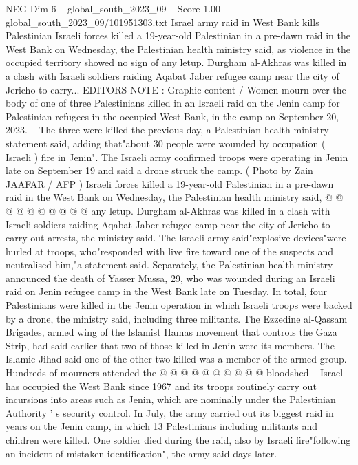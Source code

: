 \begin{textsample}{NEG Dim 6 – global\_south\_2023\_09 – Score 1.00 – global\_south\_2023\_09/101951303.txt}  \label{ex:f6_neg_003}
Israel army raid in West Bank kills Palestinian Israeli forces killed a 19-year-old Palestinian in a pre-dawn raid in the West Bank on Wednesday, the Palestinian health ministry said, as violence in the occupied territory showed no sign of any letup.
Durgham al-Akhras was killed in a clash with Israeli soldiers raiding Aqabat Jaber refugee camp near the city of Jericho to carry...
EDITORS NOTE : Graphic content / Women mourn over the body of one of three Palestinians killed in an Israeli raid on the Jenin camp for Palestinian refugees in the occupied West Bank, in the camp on September 20, 2023. -- The three were killed the previous day, a Palestinian health ministry statement said, adding that"about 30 people were wounded by occupation ( Israeli ) fire in Jenin".
The Israeli army confirmed troops were operating in Jenin late on September 19 and said a drone struck the camp. ( Photo by Zain JAAFAR / AFP ) Israeli forces killed a 19-year-old Palestinian in a pre-dawn raid in the West Bank on Wednesday, the Palestinian health ministry said, @ @ @ @ @ @ @ @ @ @ any letup.
Durgham al-Akhras was killed in a clash with Israeli soldiers raiding Aqabat Jaber refugee camp near the city of Jericho to carry out arrests, the ministry said.
The Israeli army said"explosive devices"were hurled at troops, who"responded with live fire toward one of the suspects and neutralised him,"a statement said.
Separately, the Palestinian health ministry announced the death of Yasser Mussa, 29, who was wounded during an Israeli raid on Jenin refugee camp in the West Bank late on Tuesday.
In total, four Palestinians were killed in the Jenin operation in which Israeli troops were backed by a drone, the ministry said, including three militants.
The Ezzedine al-Qassam Brigades, armed wing of the Islamist Hamas movement that controls the Gaza Strip, had said earlier that two of those killed in Jenin were its members.
The Islamic Jihad said one of the other two killed was a member of the armed group.
Hundreds of mourners attended the @ @ @ @ @ @ @ @ @ @ bloodshed -- Israel has occupied the West Bank since 1967 and its troops routinely carry out incursions into areas such as Jenin, which are nominally under the Palestinian Authority ' s security control.
In July, the army carried out its biggest raid in years on the Jenin camp, in which 13 Palestinians including militants and children were killed.
One soldier died during the raid, also by Israeli fire"following an incident of mistaken identification", the army said days later.

\end{textsample}
